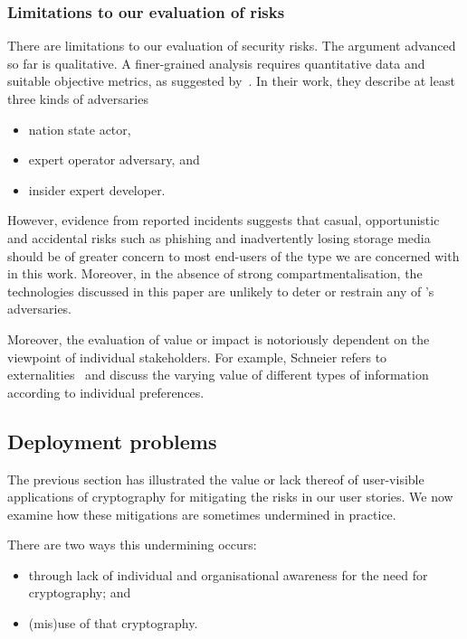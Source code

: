 \documentclass{article}
\def\citeN{\citet}
\def\citeANP{\citeauthor}
\def\cite{\citep}
\begin{document}
\subsubsection{Limitations to our evaluation of risks}

There are limitations to our evaluation of security risks.  
The argument advanced so far is qualitative.  A finer-grained analysis
requires quantitative data and suitable  objective metrics, as
suggested by~\citeN{Stolfo+11}.  In their work, they 
describe at least three kinds of  adversaries
\begin{itemize}
\item nation state actor,
\item expert operator adversary, and
\item insider expert developer.
\end{itemize}
However, evidence from reported incidents suggests that 
casual, opportunistic and accidental risks such
as phishing and inadvertently losing storage media
should be of greater concern to most end-users of the type we are
concerned with in this work.  Moreover, in the absence of
strong compartmentalisation, the technologies discussed in this paper are
unlikely to deter or restrain any of \citeANP{Stolfo+11}'s adversaries.

Moreover, the evaluation of value or impact is notoriously dependent
on the viewpoint of individual stakeholders.  For example, Schneier
refers to externalities~\cite{mSchneier07} and \citeN{Ackerman+99}
discuss the varying value of different types of information according
to individual preferences.



\subsection{Deployment problems}

The previous section has illustrated the value or lack thereof of
user-visible applications of cryptography for mitigating the risks in our user
stories.  We now examine how these mitigations are sometimes
undermined in practice.

There are two ways this undermining occurs:
\begin{itemize}
\item through lack of individual and organisational awareness for the
  need for cryptography; and
\item (mis)use of that cryptography.
\end{itemize}
\end{document}
